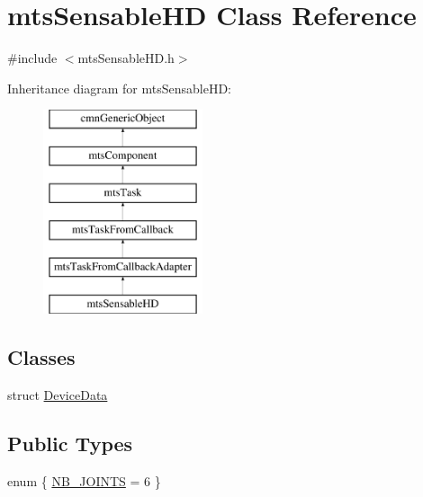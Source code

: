 \hypertarget{classmts_sensable_h_d}{}\section{mts\+Sensable\+H\+D Class Reference}
\label{classmts_sensable_h_d}


{\ttfamily \#include $<$mts\+Sensable\+H\+D.\+h$>$}

Inheritance diagram for mts\+Sensable\+H\+D\+:\begin{figure}[H]
\begin{center}
\leavevmode
\includegraphics[height=6.000000cm]{d1/d8f/classmts_sensable_h_d}
\end{center}
\end{figure}
\subsection*{Classes}
\begin{DoxyCompactItemize}
\item 
struct \hyperlink{structmts_sensable_h_d_1_1_device_data}{Device\+Data}
\end{DoxyCompactItemize}
\subsection*{Public Types}
\begin{DoxyCompactItemize}
\item 
enum \{ \hyperlink{classmts_sensable_h_d_a84d35b044861ecfea50f9fba325ad26daa92e43e72ff821fcb7bb36577c22cab4}{N\+B\+\_\+\+J\+O\+I\+N\+T\+S} = 6
 \}
\end{DoxyCompactItemize}
